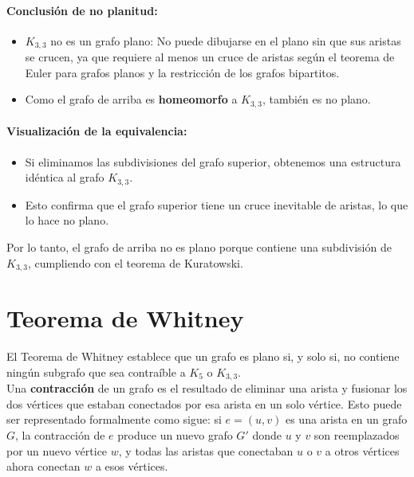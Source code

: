 \documentclass{article}
\begin{document}
\paragraph{Conclusión de no planitud:}
\begin{itemize}
    \item \( K_{3,3} \) no es un grafo plano: No puede dibujarse en el plano sin que sus aristas se crucen, ya que requiere al menos un cruce de aristas según el teorema de Euler para grafos planos y la restricción de los grafos bipartitos.
    \item Como el grafo de arriba es \textbf{homeomorfo} a \( K_{3,3} \), también es no plano.
\end{itemize}

\paragraph{Visualización de la equivalencia:}
\begin{itemize}
    \item Si eliminamos las subdivisiones del grafo superior, obtenemos una estructura idéntica al grafo \( K_{3,3} \).
    \item Esto confirma que el grafo superior tiene un cruce inevitable de aristas, lo que lo hace no plano.
\end{itemize}

Por lo tanto, el grafo de arriba no es plano porque contiene una subdivisión de \( K_{3,3} \), cumpliendo con el teorema de Kuratowski.


\newpage

\section{Teorema de Whitney}

El Teorema de Whitney establece que un grafo es plano si, y solo si, no contiene ningún subgrafo que sea contraíble a $ K_5 $ o $ K_{3,3} $. \\

Una \textbf{contracción} de un grafo es el resultado de eliminar una arista y fusionar los dos vértices que estaban conectados por esa arista en un solo vértice. Esto puede ser representado formalmente como sigue: si $ e = (u, v) $ es una arista en un grafo $ G $, la contracción de $ e $ produce un nuevo grafo $ G' $ donde $ u $ y $ v $ son reemplazados por un nuevo vértice $ w $, y todas las aristas que conectaban $ u $ o $ v $ a otros vértices ahora conectan $ w $ a esos vértices.
\end{document}
